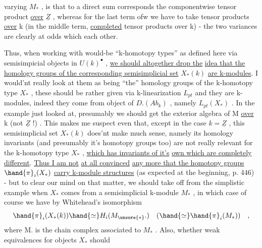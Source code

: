
varying $M_{*}$ , is that to a direct sum corresponds the componentwise
tensor product \uline{over} $\underline{Z}$ , whereas for the last term of\hand{(}w\hand{)} we have to take
tensor products \uline{over} k (in the middle term, \uline{completed} tensor products
over k) - the two variances are clearly at odds which each other.

Thus, when working with would-be ``k-homotopy types'' as defined
here via semisimpicial objects in $U(k)^{\bullet}$ , \uline{we should altogether drop the}
\uline{idea that the homology groups of the corresponding semisimplicial set}
$X_{*}(k)$ \uline{are k-modules}. I would'nt really look at them as being ``the''
homology groups of the k-homotopy type $X_{*}$ , these should be rather given
via k-linearization  $L_{pt}$ and they are k-modules, indeed they come
from   object of $D.(Ab_{k})$ , namely $L_{pt}(X_{*})$ . In the example just
looked at, presumably we should get the exterior algebra of M \uline{over} k
(not $\underline{Z}$ !) . This makes me suspect even that, except in the case $k=\underline{Z}$ ,
this semisimplicial set $X_{*}(k)$ does'nt make much sense, namely its
homology invariants (and presumably it's homotopy groups too) are not
really relevant for the k-homotopy type $X_{*}$ , \uline{which has invariants of it's}
\uline{own which are completely different}. \uline{Thus I am not}  \uline{at all convinced}
 \uline{any more that the homotopy groups} $\hand{\pi}_{i}(X_{*})$ \uline{carry k-module structures} (as
expected at the beginning, p. 446) - but to clear our mind on that
matter, we should take off from the simplistic example when $X_{*}$ comes
from a semisimplicial k-module $M_{*}$ , in which case of course we have by
Whitehead's isomorphism
\[ \hand{\pi}_{i}(X_{*}(k)) \hand{\simeq} H_{i}(M_{\unsure{*}}.) \quad ( \hand{\simeq} \hand{\pi}_{i}(M_{*})) \quad , \]
where M. is the chain complex associated to $M_{*}$ . Also, 
  whether weak equivalences  for objects $X_{*}$ should

